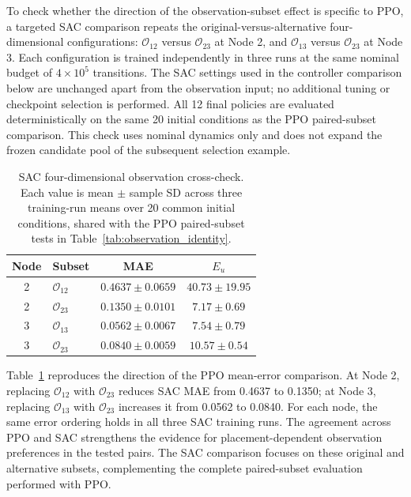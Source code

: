 \documentclass[a4paper,fleqn]{cas-sc}
\theoremstyle{plain}
\theoremstyle{definition}
\begin{document}
To check whether the direction of the observation-subset effect is specific to PPO, a targeted SAC comparison repeats the original-versus-alternative four-dimensional configurations: $\mathcal O_{12}$ versus $\mathcal O_{23}$ at Node 2, and $\mathcal O_{13}$ versus $\mathcal O_{23}$ at Node 3. Each configuration is trained independently in three runs at the same nominal budget of $4\times10^5$ transitions. The SAC settings used in the controller comparison below are unchanged apart from the observation input; no additional tuning or checkpoint selection is performed. All 12 final policies are evaluated deterministically on the same 20 initial conditions as the PPO paired-subset comparison. This check uses nominal dynamics only and does not expand the frozen candidate pool of the subsequent selection example.

\begin{table}[pos=htbp,width=\linewidth]
\centering\small
\setlength{\tabcolsep}{3pt}
\caption{SAC four-dimensional observation cross-check. Each value is mean $\pm$ sample SD across three training-run means over 20 common initial conditions, shared with the PPO paired-subset tests in Table~\ref{tab:observation_identity}.}
\label{tab:sac_observation_check}
\begin{tabular}{@{}clcc@{}}
\toprule
Node & Subset & MAE & $E_u$ \\
\midrule
2 & $\mathcal O_{12}$ & $0.4637\pm0.0659$ & $40.73\pm19.95$ \\
2 & $\mathcal O_{23}$ & $0.1350\pm0.0101$ & $7.17\pm0.69$ \\
3 & $\mathcal O_{13}$ & $0.0562\pm0.0067$ & $7.54\pm0.79$ \\
3 & $\mathcal O_{23}$ & $0.0840\pm0.0059$ & $10.57\pm0.54$ \\
\bottomrule
\end{tabular}
\end{table}

Table~\ref{tab:sac_observation_check} reproduces the direction of the PPO mean-error comparison. At Node 2, replacing $\mathcal O_{12}$ with $\mathcal O_{23}$ reduces SAC MAE from 0.4637 to 0.1350; at Node 3, replacing $\mathcal O_{13}$ with $\mathcal O_{23}$ increases it from 0.0562 to 0.0840. For each node, the same error ordering holds in all three SAC training runs. The agreement across PPO and SAC strengthens the evidence for placement-dependent observation preferences in the tested pairs. The SAC comparison focuses on these original and alternative subsets, complementing the complete paired-subset evaluation performed with PPO.
\end{document}
